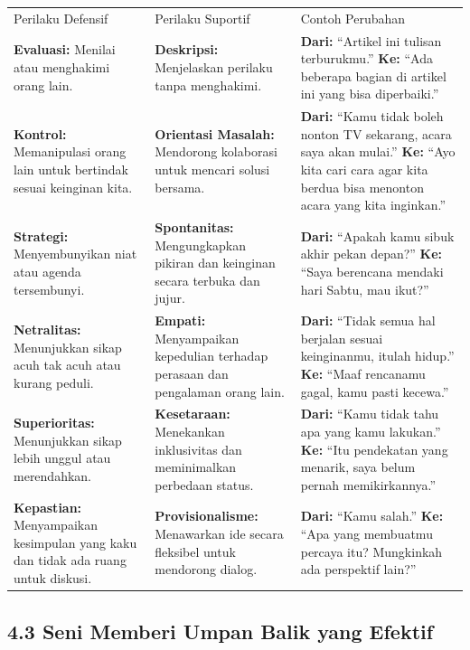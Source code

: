 \documentclass[
  letterpaper,
  DIV=11,
  numbers=noendperiod]{scrreprt}
\begin{document}
\begin{longtable}[]{@{}
  >{\raggedright\arraybackslash}p{}
  >{\raggedright\arraybackslash}p{}
  >{\raggedright\arraybackslash}p{}@{}}
\toprule\noalign{}
\endhead
\bottomrule\noalign{}
\endlastfoot
Perilaku Defensif & Perilaku Suportif & Contoh Perubahan \\
\textbf{Evaluasi:} Menilai atau menghakimi orang lain. &
\textbf{Deskripsi:} Menjelaskan perilaku tanpa menghakimi. &
\textbf{Dari:} ``Artikel ini tulisan terburukmu.'' \textbf{Ke:} ``Ada
beberapa bagian di artikel ini yang bisa diperbaiki.'' \\
\textbf{Kontrol:} Memanipulasi orang lain untuk bertindak sesuai
keinginan kita. & \textbf{Orientasi Masalah:} Mendorong kolaborasi untuk
mencari solusi bersama. & \textbf{Dari:} ``Kamu tidak boleh nonton TV
sekarang, acara saya akan mulai.'' \textbf{Ke:} ``Ayo kita cari cara
agar kita berdua bisa menonton acara yang kita inginkan.'' \\
\textbf{Strategi:} Menyembunyikan niat atau agenda tersembunyi. &
\textbf{Spontanitas:} Mengungkapkan pikiran dan keinginan secara terbuka
dan jujur. & \textbf{Dari:} ``Apakah kamu sibuk akhir pekan depan?''
\textbf{Ke:} ``Saya berencana mendaki hari Sabtu, mau ikut?'' \\
\textbf{Netralitas:} Menunjukkan sikap acuh tak acuh atau kurang peduli.
& \textbf{Empati:} Menyampaikan kepedulian terhadap perasaan dan
pengalaman orang lain. & \textbf{Dari:} ``Tidak semua hal berjalan
sesuai keinginanmu, itulah hidup.'' \textbf{Ke:} ``Maaf rencanamu gagal,
kamu pasti kecewa.'' \\
\textbf{Superioritas:} Menunjukkan sikap lebih unggul atau merendahkan.
& \textbf{Kesetaraan:} Menekankan inklusivitas dan meminimalkan
perbedaan status. & \textbf{Dari:} ``Kamu tidak tahu apa yang kamu
lakukan.'' \textbf{Ke:} ``Itu pendekatan yang menarik, saya belum pernah
memikirkannya.'' \\
\textbf{Kepastian:} Menyampaikan kesimpulan yang kaku dan tidak ada
ruang untuk diskusi. & \textbf{Provisionalisme:} Menawarkan ide secara
fleksibel untuk mendorong dialog. & \textbf{Dari:} ``Kamu salah.''
\textbf{Ke:} ``Apa yang membuatmu percaya itu? Mungkinkah ada perspektif
lain?'' \\
\end{longtable}

\subsection{\texorpdfstring{\textbf{4.3 Seni Memberi Umpan Balik yang
Efektif}}{4.3 Seni Memberi Umpan Balik yang Efektif}}\label{seni-memberi-umpan-balik-yang-efektif}
\end{document}
